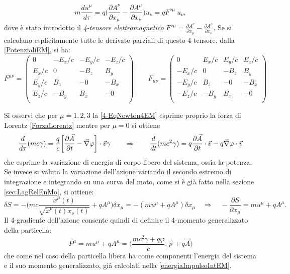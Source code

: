 \begin{equation}
    m\frac{du^\mu}{d\tau}=q\bigg(\frac{\partial A^\nu}{\partial x_\mu}-\frac{\partial A^\mu}{\partial x_\nu}\bigg)u_\nu=qF^{\nu\mu}\ u_\nu,\label{4-EqNewton4EM}
\end{equation}
dove è stato introdotto il \emph{4-tensore elettromagnetico} $F^{\nu\mu}=\frac{\partial A^\nu}{\partial x_\mu}-\frac{\partial A^\mu}{\partial x_\nu}$. Se si calcolano esplicitamente tutte le derivate parziali di questo 4-tensore, dalla \eqref{PotenzialiEM}, si ha:
\begin{equation}
    \label{4-tensoreEM}
    F^{\mu\nu}=
    \begin{pmatrix}
        0&-E_x/c&-E_y/c&-E_z/c\\
        E_x/c&0&-B_z&B_y\\
        E_y/c&B_z&-0&-B_x\\
        E_z/c&-B_y&B_x&-0\\
 \end{pmatrix}\qquad
 F_{\mu\nu}=
 \begin{pmatrix}
     0&E_x/c&E_y/c&E_z/c\\
     -E_x/c&0&-B_z&B_y\\
     -E_y/c&B_z&-0&-B_x\\
     -E_z/c&-B_y&B_x&-0\\
\end{pmatrix}
\end{equation}

Si osservi che per $\mu=1,2,3$ la \eqref{4-EqNewton4EM} esprime proprio la forza di Lorentz \eqref{ForzaLorentz} mentre per $\mu=0$ si ottiene
\begin{equation}
    \frac{d}{d\tau}(mc\gamma)=\frac{q}{c}\bigg[\frac{\partial \vec A}{\partial t}-\vec{\nabla} \varphi\bigg]\cdot \vec v\gamma \qquad \Rightarrow \qquad \frac{d}{dt}(mc^2\gamma)=q\frac{\partial \vec A}{\partial t}\cdot \vec v - q\vec{\nabla} \varphi\cdot \vec v
\end{equation}
che esprime la variazione di energia di corpo libero del sistema, ossia la potenza.\\

Se invece si valuta la variazione dell'azione variando il secondo estremo di integrazione e integrando su una curva del moto, come si è già fatto nella sezione \ref{sec:LagRelEnMo}, si ottiene:
\begin{equation*}
    \delta S=-\bigg(mc\frac{\dot x^\mu(t)}{\sqrt{\dot x^\nu(t)\dot x_\nu(t)}}+qA^\mu\bigg)\delta x_\mu=-(mu^\mu+qA^\mu)\delta x_\mu \quad \Rightarrow \quad -\frac{\partial S}{\partial x_\mu}=mu^\mu+qA^\mu.
\end{equation*}
Il 4-gradiente dell'azione consente quindi di definire il 4-momento generalizzato della particella:
\begin{equation}
    P^\mu=mu^\mu+qA^\mu=\bigg(\frac{mc^2\gamma+q\varphi}{c},\vec p+q\vec A\bigg)
\end{equation}
che come nel caso della particella libera ha come componenti l'energia del sistema e il suo momento generalizzato, già calcolati nella \eqref{energiaImpulsoIntEM}.
